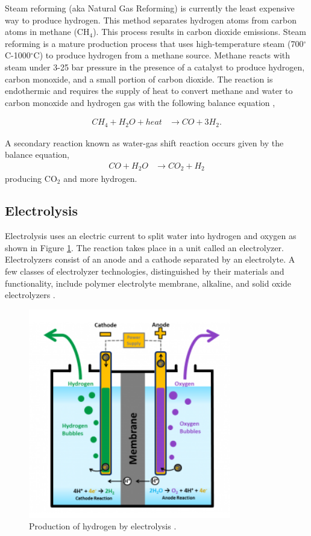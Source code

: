 \documentclass{anstrans}
\begin{document}
Steam reforming (aka Natural Gas Reforming) is currently the least expensive way to produce hydrogen. This method separates hydrogen atoms from carbon atoms in methane (CH$_4$). This process results in carbon dioxide emissions.
Steam reforming is a mature production process that uses high-temperature steam (700$^{\circ}$C-1000$^{\circ}$C) to produce hydrogen from a methane source. Methane reacts with steam under 3-25 bar pressure in the presence of a catalyst to produce hydrogen, carbon monoxide, and a small portion of carbon dioxide.
The reaction is endothermic and requires the supply of heat to convert methane and water to carbon monoxide and hydrogen gas with the following balance equation \cite{doe_office_of_energy_efficiency_and_renewable_energy_hydrogen_2020},

\begin{align}
CH_4 + H_2O + heat & \rightarrow CO + 3H_2 .
\label{eq:1}
\end{align}

A secondary reaction known as water-gas shift reaction occurs given by the balance equation,
\begin{align}
CO + H_2O & \rightarrow CO_2 + H_2
\label{eq:2}
\end{align}
producing CO$_2$ and more hydrogen.

\subsection{Electrolysis}

Electrolysis uses an electric current to split water into hydrogen and oxygen as shown in Figure \ref{fig:electro}. The reaction takes place in a unit called an electrolyzer. Electrolyzers consist of an anode and a cathode separated by an electrolyte.
A few classes of electrolyzer technologies, distinguished by their materials and functionality, include polymer electrolyte membrane, alkaline, and solid oxide electrolyzers \cite{doe_office_of_energy_efficiency_and_renewable_energy_hydrogen_2020}.

\begin{figure}[H]
	\centering
	\includegraphics[width=0.55\linewidth]{figures/electrolysis.png}
	\hfill
	\caption{Production of hydrogen by electrolysis \cite{doe_office_of_energy_efficiency_and_renewable_energy_hydrogen_2020}.}
	\label{fig:electro}
\end{figure}
\end{document}
